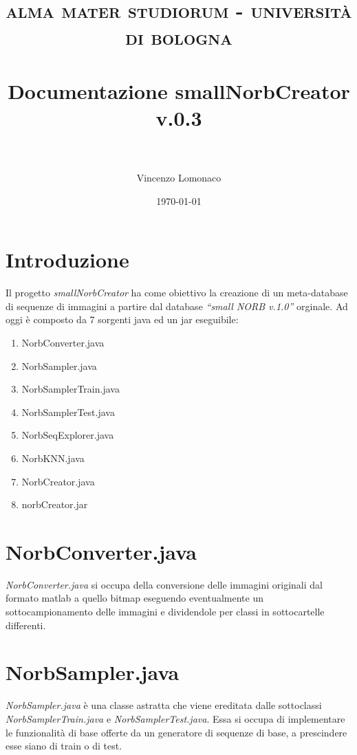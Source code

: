 \documentclass[paper=a4, fontsize=11pt]{scrartcl} %
\title{	
\normalfont \normalsize 
\textsc{alma mater studiorum - università di bologna} \\ [25pt] %
\horrule{0.5pt} \\[0.4cm] %
\huge Documentazione smallNorbCreator v.0.3 \\ %
\horrule{0.5pt} \\[0.5cm] %
}
\author{Vincenzo Lomonaco} %
\date{\normalsize\today} %
\numberwithin{equation}{section} %
\numberwithin{figure}{section} %
\numberwithin{table}{section} %
\begin{document}
\maketitle %


\section{Introduzione}

Il progetto \emph{smallNorbCreator} ha come obiettivo la creazione di un meta-database di sequenze di immagini a partire dal database \emph{``small NORB v.1.0''} orginale.
Ad oggi è composto da 7 sorgenti java ed un jar eseguibile:

\begin{enumerate}
	\item NorbConverter.java
	\item NorbSampler.java
	\item NorbSamplerTrain.java
	\item NorbSamplerTest.java 
	\item NorbSeqExplorer.java
	\item NorbKNN.java 
	\item NorbCreator.java
	\item norbCreator.jar
\end{enumerate}

\section{NorbConverter.java}
\emph{NorbConverter.java} si occupa della conversione delle immagini originali dal formato matlab a quello bitmap eseguendo eventualmente un sottocampionamento delle immagini e dividendole per classi in sottocartelle differenti.

\section{NorbSampler.java}
\emph{NorbSampler.java} è una classe astratta che viene ereditata dalle sottoclassi \emph{NorbSamplerTrain.java} e \emph{NorbSamplerTest.java}. Essa si occupa di implementare le funzionalità di base offerte da un generatore di sequenze di base, a prescindere esse siano di train o di test.
\end{document}
